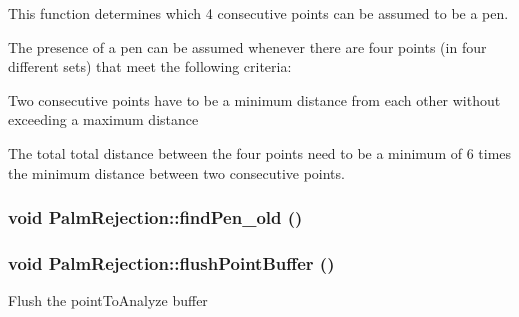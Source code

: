 This function determines which 4 consecutive points can be assumed to be a pen.

The presence of a pen can be assumed whenever there are four points (in four different sets) that meet the following criteria:
\begin{DoxyItemize}
\item Two consecutive points have to be a minimum distance from each other without exceeding a maximum distance
\item The total total distance between the four points need to be a minimum of 6 times the minimum distance between two consecutive points. 
\end{DoxyItemize}\hypertarget{classPalmRejection_a2ae92b6a2be26fdfaa4b8cf848f4f6fe}{
\subsubsection[{findPen\_\-old}]{\setlength{\rightskip}{0pt plus 5cm}void PalmRejection::findPen\_\-old ()}}
\label{classPalmRejection_a2ae92b6a2be26fdfaa4b8cf848f4f6fe}
\hypertarget{classPalmRejection_a20bea4c32f648e75a448e0ad8bfb3080}{
\subsubsection[{flushPointBuffer}]{\setlength{\rightskip}{0pt plus 5cm}void PalmRejection::flushPointBuffer ()}}
\label{classPalmRejection_a20bea4c32f648e75a448e0ad8bfb3080}
Flush the pointToAnalyze buffer

